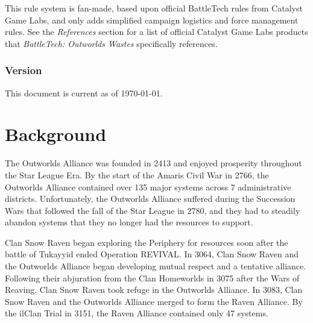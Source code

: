 \documentclass{article}
\begin{document}
This rule system is fan-made, based upon official BattleTech rules from Catalyst Game Labs, and only adds simplified campaign logistics and force management rules.
See the \emph{References} section for a list of official Catalyst Game Labs products that \emph{BattleTech: Outworlds Wastes} specifically references.

\subsubsection*{Version}

This document is current as of \today.

\newpage

\tableofcontents

\newpage

\section{Background}

The Outworlds Alliance was founded in 2413 and enjoyed prosperity throughout the Star League Era.
By the start of the Amaris Civil War in 2766, the Outworlds Alliance contained over 135 major systems across 7 administrative districts.
Unfortunately, the Outworlds Alliance suffered during the Succession Wars that followed the fall of the Star League in 2780, and they had to steadily abandon systems that they no longer had the resources to support.

Clan Snow Raven began exploring the Periphery for resources soon after the battle of Tukayyid ended Operation REVIVAL.
In 3064, Clan Snow Raven and the Outworlds Alliance began developing mutual respect and a tentative alliance.
Following their abjuration from the Clan Homeworlds in 3075 after the Wars of Reaving, Clan Snow Raven took refuge in the Outworlds Alliance.
In 3083, Clan Snow Raven and the Outworlds Alliance merged to form the Raven Alliance.
By the ilClan Trial in 3151, the Raven Alliance contained only 47 systems.
\end{document}

